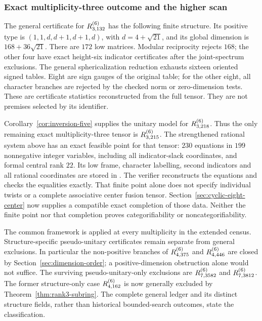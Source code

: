 \subsubsection{Exact multiplicity-three outcome and the higher scan}
The general certificate for $R^{(6)}_{3,132}$ has the following finite
structure. Its positive type is $(1,1,d,d+1,d+1,d)$, with
$d=4+\sqrt{21}$, and its global dimension is $168+36\sqrt{21}$.
There are $172$ low matrices. Modular reciprocity rejects $168$;
the other four have exact height-six indicator certificates after the
joint-spectrum exclusions. The general sphericalization reduction
exhausts sixteen oriented signed tables. Eight are sign gauges of the
original table; for the other eight, all character branches are rejected
by the checked norm or zero-dimension tests. These are certificate
statistics reconstructed from the full tensor. They are not premises
selected by its identifier.

Corollary~\ref{cor:inversion-five} supplies the unitary model for
$R^{(6)}_{3,218}$. Thus the only remaining exact multiplicity-three tensor
is $R^{(6)}_{3,215}$. The strengthened rational system above has an exact
feasible point for that tensor: $230$ equations in $199$ nonnegative
integer variables, including all indicator-slack coordinates, and formal central
rank $22$. Its low frame, character labelling, second indicators and
all rational coordinates are stored in
. The verifier reconstructs
the equations and checks the equalities exactly. That finite point alone
does not specify individual twists or a complete associative center
fusion tensor. Section~\ref{sec:cyclic-eight-center} now supplies a
compatible exact completion of those data. Neither the finite point nor
that completion proves categorifiability or noncategorifiability.

The common framework is applied at every multiplicity in the extended
census. Structure-specific pseudo-unitary certificates remain separate
from general exclusions. In particular the non-positive branches of
$R^{(6)}_{4,375}$ and $R^{(6)}_{4,446}$ are closed by
Section~\ref{sec:dimension-order}; a positive-dimension obstruction alone
would not suffice. The surviving pseudo-unitary-only exclusions are
$R^{(6)}_{7,3582}$ and $R^{(6)}_{7,3812}$.
The former structure-only case $R^{(6)}_{4,162}$ is now generally excluded
by Theorem~\ref{thm:rank3-subring}.
The complete general ledger and its distinct structure fields, rather
than historical bounded-search outcomes, state the classification.

